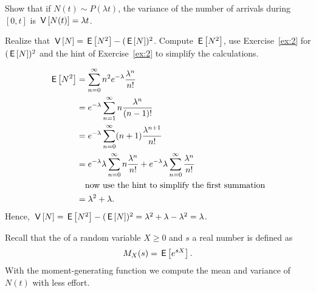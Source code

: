 \begin{exercise}
  Show that if $N(t)\sim P(\lambda t)$, the variance of the number of arrivals during $[0,t]$ is $\,\mathsf{V}\left[N(t)\right] = \lambda t$. 
  \begin{hint}
Realize that $\,\mathsf{V}\left[N\right] = \,\mathsf{E}\left[N^2\right] - (\,\mathsf{E}\left[N\right])^2$. Compute $\,\mathsf{E}\left[N^2\right]$, use Exercise~\ref{ex:2} for $(\,\mathsf{E}\left[N\right])^2$ and the hint of Exercise~\ref{ex:2} to simplify the calculations. 
  \end{hint}
  \begin{solution} 

    \begin{align*}
      \,\mathsf{E}\left[N^2\right]
&= \sum_{n=0}^\infty n^2 e^{-\lambda}\frac{\lambda^n}{n!}  \\
&= e^{-\lambda} \sum_{n=1}^\infty n \frac{\lambda^n}{(n-1)!}  \\
&= e^{-\lambda} \sum_{n=0}^\infty (n+1) \frac{\lambda^{n+1}}{n!}  \\
&= e^{-\lambda} \lambda \sum_{n=0}^\infty n \frac{\lambda^{n}}{n!}  +e^{-\lambda}\lambda \sum_{n=0}^\infty\frac{\lambda^{n}}{n!}  \\
&\quad\text{now use the hint to simplify the first summation} \\
&= \lambda^2  + \lambda.
\end{align*}
Hence, $\,\mathsf{V}\left[N\right] = \,\mathsf{E}\left[N^2\right] - (\,\mathsf{E}\left[N\right])^2 = \lambda^2 + \lambda - \lambda^2 = \lambda$.
\end{solution}
\end{exercise}

Recall that the   of a random variable $X\geq 0$ and $s$ a real number is defined as
\begin{equation*}
  M_X(s) = \,\mathsf{E}\left[e^{s X}\right].
\end{equation*}
With the moment-generating function we compute the mean and variance of $N(t)$ with less effort. 


